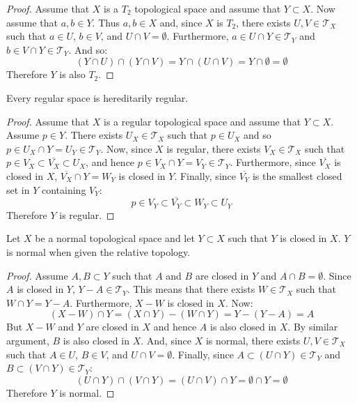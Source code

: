 \documentclass[letterpaper,12pt,fleqn]{article}
\newcommand{\T}{\mathscr{T}}
\begin{document}
\begin{proof}
  Assume that \(X\) is a \(T_2\) topological space and assume that \(Y\subset X\).  Now assume that \(a,b\in Y\).
  Thus \(a,b\in X\) and, since \(X\) is \(T_2\), there exists \(U,V\in\T_X\) such that \(a\in U\), \(b\in V\), and
  \(U\cap V=\emptyset\).  Furthermore, \(a\in U\cap Y\in\T_Y\) and \(b\in V\cap Y\in\T_Y\).  And so:
  \[(Y\cap U)\cap(Y\cap V)=Y\cap(U\cap V)=Y\cap\emptyset=\emptyset\]
  Therefore \(Y\) is also \(T_2\).
\end{proof}

\begin{theorem}[4.20]
  Every regular space is hereditarily regular.
\end{theorem}

\begin{proof}
  Assume that \(X\) is a regular topological space and assume that \(Y\subset X\).  Assume \(p\in Y\).  There
  exists \(U_X\in\T_X\) such that \(p\in U_X\) and so \(p\in U_X\cap Y=U_Y\in\T_Y\).  Now, since \(X\) is regular,
  there exists \(V_X\in\T_X\) such that \(p\in V_X\subset\overline{V_X}\subset U_X\), and hence
  \(p\in V_X\cap Y=V_Y\in\T_Y\).  Furthermore, since \(\overline{V_X}\) is closed in \(X\),
  \(\overline{V_X}\cap Y=W_Y\) is closed in \(Y\).  Finally, since \(\overline{V_Y}\) is the smallest closed set in
  \(Y\) containing \(V_Y\):
  \[p\in V_Y\subset\overline{V_Y}\subset W_Y\subset U_Y\]
  Therefore \(Y\) is regular.
\end{proof}

\begin{theorem}[4.23]
  Let \(X\) be a normal topological space and let \(Y\subset X\) such that \(Y\) is closed in \(X\).  \(Y\) is
  normal when given the relative topology.
\end{theorem}

\begin{proof}
  Assume \(A,B\subset Y\) such that \(A\) and \(B\) are closed in \(Y\) and \(A\cap B=\emptyset\).  Since \(A\) is
  closed in \(Y\), \(Y-A\in\T_Y\).  This means that there exists \(W\in\T_X\) such that \(W\cap Y=Y-A\).
  Furthermore, \(X-W\) is closed in \(X\).  Now:
  \[(X-W)\cap Y=(X\cap Y)-(W\cap Y)=Y-(Y-A)=A\]
  But \(X-W\) and \(Y\) are closed in \(X\) and hence \(A\) is also closed in \(X\).  By similar argument, \(B\) is
  also closed in \(X\).  And, since \(X\) is normal, there exists \(U,V\in\T_X\) such that \(A\in U\), \(B\in V\),
  and \(U\cap V=\emptyset\).  Finally, since \(A\subset(U\cap Y)\in\T_Y\) and \(B\subset(V\cap Y)\in\T_Y\):
  \[(U\cap Y)\cap(V\cap Y)=(U\cap V)\cap Y=\emptyset\cap Y=\emptyset\]
  Therefore \(Y\) is normal.
\end{proof}
\end{document}

